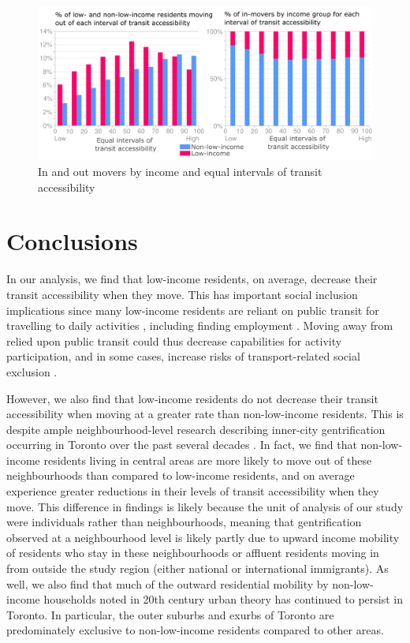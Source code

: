 \begin{figure}[H]
	\centering
	\includegraphics[width=1\linewidth]{figures/res_acc_inc_bars.png}
	\caption[]{In and out movers by income and equal intervals of transit accessibility}
	\label{fig:res_acc_inc}
\end{figure}





\section{Conclusions}

In our analysis, we find that low-income residents, on average, decrease their transit accessibility when they move. This has important social inclusion implications since many low-income residents are reliant on public transit for travelling to daily activities \cite{allen_planning_2020,barri_can_2021}, including finding employment \cite{fransen_relationship_2019,bastiaanssen_does_2021}. Moving away from relied upon public transit could thus decrease capabilities for activity participation, and in some cases, increase risks of transport-related social exclusion \cite{lucas_transport_2012,allen_planning_2020}.

However, we also find that low-income residents do not decrease their transit accessibility when moving at a greater rate than non-low-income residents. This is despite ample neighbourhood-level research describing inner-city gentrification occurring in Toronto over the past several decades \cite{hulchanski_three_2010,walks_gentrification_2021}. In fact, we find that non-low-income residents living in central areas are more likely to move out of these neighbourhoods than compared to low-income residents, and on average experience greater reductions in their levels of transit accessibility when they move. This difference in findings is likely because the unit of analysis of our study were individuals rather than neighbourhoods, meaning that gentrification observed at a neighbourhood level is likely partly due to upward income mobility of residents who stay in these neighbourhoods or affluent residents moving in from outside the study region (either national or international immigrants). As well, we also find that much of the outward residential mobility by non-low-income households noted in 20th century urban theory \cite{burgess_growth_1925,alonso_location_1964} has continued to persist in Toronto. In particular, the outer suburbs and exurbs of Toronto are predominately exclusive to non-low-income residents compared to other areas. 

